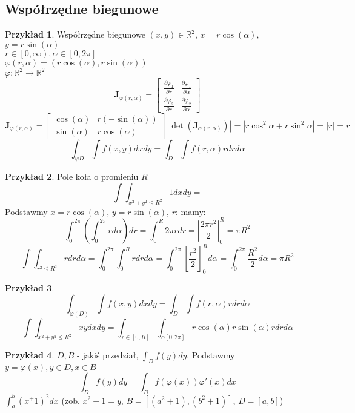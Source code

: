 \documentclass{article}
\theoremstyle{definition}
\theoremstyle{definition}
\theoremstyle{definition}
\newtheorem{pk}{Przykład}[subsection]
\theoremstyle{definition}
\begin{document}
\subsection{Współrzędne biegunowe}

\begin{pk}
    Współrzędne biegunowe $(x,y)\in\mathbb{R}^2$, $x=r\cos(\alpha)$, $y=r\sin(\alpha)$\\
    $r\in\left[0,\infty\right), \alpha \in [0,2\pi]$\\
    $\varphi(r,\alpha) = \left(r\cos(\alpha),r\sin(\alpha)\right)$\\
    $\varphi : \mathbb{R}^2 \rightarrow \mathbb{R}^2$\\
    \[\mathbf{J}_{\varphi(r,\alpha)} = \begin{bmatrix}\frac{\partial \varphi_1}{\partial r}&\frac{\partial \varphi_1}{\partial \alpha}\\\frac{\partial \varphi_2}{\partial r}&\frac{\partial \varphi_2}{\partial \alpha}\end{bmatrix}\]
    \[\mathbf{J}_{\varphi(r,\alpha)} = \begin{bmatrix}\cos(\alpha)&r(-\sin(\alpha))\\\sin(\alpha)&r\cos(\alpha)\end{bmatrix} |\det(\mathbf{J}_{\alpha(r,\alpha)})| = |r\cos^2\alpha + r\sin^2 \alpha| = |r| = r\]
    \[\int_{\varphi{D}} \int f(x,y) dx dy = \int_D \int f(r,\alpha) r dr d\alpha\]
\end{pk}

\begin{pk}
    Pole koła o promieniu $R$
    \[\int\int_{x^2+y^2\leq R^2} 1 dx dy =\]
    Podstawmy $x=r\cos(\alpha)$, $y=r\sin(\alpha)$, $r$: mamy:\\
    \[\int_{0}^{2\pi}\left(\int_{0}^{2\pi} r d\alpha\right) dr = \int_{0}^{R} 2\pi r dr = \left|\frac{2\pi r^2}{2}\right|_{0}^{R} = \pi R^2\]
    \[\int\int_{r^2\leq R^2} r dr d\alpha = \int_0^{2\pi} \int_0^R r dr d\alpha = \int_0^{2\pi} \left[\frac{r^2}{2}\right]_0^R d\alpha = \int_0^{2\pi} \frac{R^2}{2} d\alpha = \pi R^2\]
\end{pk}

\begin{pk}
    \[\int_{\varphi(D)}\int f(x,y) dxdy = \int_{D}\int f(r,\alpha) r dr d\alpha\]
    \[\int\int_{x^2+y^2\leq R^2} xy dx dy = \int_{r\in[0,R]}\int_{\alpha[0,2\pi]} r\cos(\alpha) r\sin(\alpha) r dr d\alpha\]
\end{pk}

\begin{pk}
    $D, B$ - jakiś przedział,  $\int_D f(y) dy$. Podstawmy $y=\varphi(x), y\in D, x\in B$\\
    \[\int_D f(y) dy = \int_B f(\varphi(x)) \varphi'(x) dx\]
    $\int_{a}^{b} (x^+1)^2 dx$ (zob. $x^2+1=y$, $B=[(a^2+1),(b^2+1)]$, $D=[a,b]$)
\end{pk}
\end{document}
